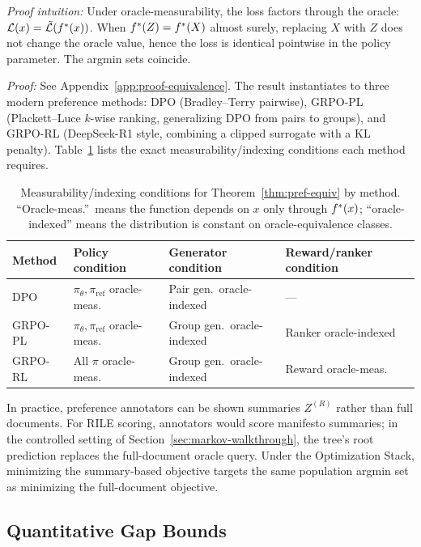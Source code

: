 \noindent\textit{Proof intuition:} Under oracle-measurability, the loss factors through the oracle: $\mathcal{L}(x) = \tilde{\mathcal{L}}(f^\ast(x))$. When $f^\ast(Z) = f^\ast(X)$ almost surely, replacing $X$ with $Z$ does not change the oracle value, hence the loss is identical pointwise in the policy parameter. The argmin sets coincide.

\noindent\textit{Proof:} See Appendix~\ref{app:proof-equivalence}. The result instantiates to three modern preference methods: DPO (Bradley--Terry pairwise), GRPO-PL (Plackett--Luce $k$-wise ranking, generalizing DPO from pairs to groups), and GRPO-RL (DeepSeek-R1 style, combining a clipped surrogate with a KL penalty). Table~\ref{tab:measurability} lists the exact measurability/indexing conditions each method requires.
\begin{table}[htbp]
\centering\small
\begin{tabular}{llll}
\toprule
Method & Policy condition & Generator condition & Reward/ranker condition \\
\midrule
DPO & $\pi_\theta, \pi_{\mathrm{ref}}$ oracle-meas.\ & Pair gen.\ oracle-indexed & --- \\
GRPO-PL & $\pi_\theta, \pi_{\mathrm{ref}}$ oracle-meas.\ & Group gen.\ oracle-indexed & Ranker oracle-indexed \\
GRPO-RL & All $\pi$ oracle-meas.\ & Group gen.\ oracle-indexed & Reward oracle-meas.\ \\
\bottomrule
\end{tabular}
\caption{Measurability/indexing conditions for Theorem~\ref{thm:pref-equiv} by method. ``Oracle-meas.''\ means the function depends on $x$ only through $f^\ast(x)$; ``oracle-indexed'' means the distribution is constant on oracle-equivalence classes.}
\label{tab:measurability}
\end{table}

In practice, preference annotators can be shown summaries $Z^{(R)}$ rather than full documents. For RILE scoring, annotators would score manifesto summaries; in the controlled setting of Section~\ref{sec:markov-walkthrough}, the tree's root prediction replaces the full-document oracle query. Under the Optimization Stack, minimizing the summary-based objective targets the same population argmin set as minimizing the full-document objective.

\subsection{Quantitative Gap Bounds}

